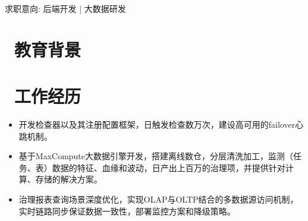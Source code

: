 \documentclass{resume}
\begin{document}


\centerline{求职意向: 后端开发 | 大数据研发}
\vspace{1ex}


\vspace{-1ex}
 
\section{\faGraduationCap\  教育背景}

\vspace{1ex}


\section{\faSitemap\ 工作经历}
\vspace{-0.5ex}
\begin{onehalfspacing}
\begin{itemize}
  \item 开发检查器以及其注册配置框架，日触发检查数万次，建设高可用的failover心跳机制。
  \item 基于MaxCompute大数据引擎开发，搭建离线数仓，分层清洗加工，监测（任务、表）数据的特征、血缘和波动，日产出上百万的治理项，并提供针对计算、存储的解决方案。
  \item 治理报表查询场景深度优化，实现OLAP与OLTP结合的多数据源访问机制，实时链路同步保证数据一致性，部署监控方案和降级策略。
\end{itemize}
\end{onehalfspacing}
\end{document}
